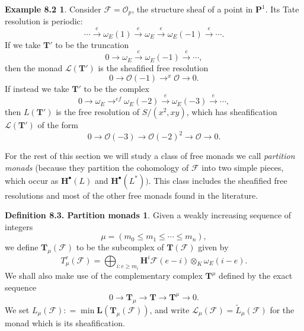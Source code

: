 \documentclass{tran-l}
\newcommand{\tensor}{\otimes}
\newcommand{\F}{\mathcal{F}}
\newcommand{\myH}{\mathbf{H}}
\newcommand{\LL}{\mathbf{L}}
\newcommand{\PP}{\mathbf{P}}
\newcommand{\TT}{\mathbf{T}}
\theoremstyle{plain}
\theoremstyle{remark}
\theoremstyle{definition}
\newtheorem*{definition7}{Example 8.2}
\newtheorem*{definition8}{Definition 8.3. Partition monads}
\begin{document}
\begin{definition7}
Consider $\F = \mathcal{O} _{p}$, the structure sheaf of a
point in $\PP ^{1}$. Its Tate resolution is periodic:
\begin{equation*}\cdots \overset {e}{\longrightarrow }\omega _{E}(1) \overset {e}{\longrightarrow }\omega _{E}
\overset {e}{\longrightarrow }\omega _{E}(-1) \overset {e}{\longrightarrow }\cdots .
\end{equation*}
If we take $\TT '$ to be the truncation
\begin{equation*}0 \longrightarrow \omega _{E} \overset {e}{\longrightarrow }\omega _{E}(-1)\overset {e}{\longrightarrow }
\cdots, \end{equation*}
then the monad $\mathcal{L}(\TT ')$ is the sheafified free resolution
\begin{equation*}0 \longrightarrow \mathcal{O} (-1) \longrightarrow ^{x} \mathcal{O} \longrightarrow 0.
\end{equation*}
If instead we take $\TT '$ to be the complex
\begin{equation*} 0 \longrightarrow \omega _{E} \longrightarrow ^{ef}
\omega _{E}(-2) \overset {e}{\longrightarrow }\omega _{E}(-3)
\overset {e}{\longrightarrow }\cdots ,
\end{equation*}
then $L(\TT ')$ is the free resolution of
$S/(x^{2},xy)$,
which has sheafification $\mathcal{L}(\TT ')$ of the form
\begin{equation*} 0 \longrightarrow \mathcal{O} (-3) \longrightarrow \mathcal{O} (-2)^{2}
\longrightarrow \mathcal{O} \longrightarrow 0.
\end{equation*}

For the rest of this section we will study a class of free monads we
call {\em partition monads\/} (because they partition the cohomology
of $\F $ into two simple pieces, which occur as $\myH ^{\bullet }(L)$ and  $\myH ^{\bullet }(L^{*}))$. This class includes
the sheafified free resolutions and most of the other free monads
found in the literature.
\end{definition7}
\begin{definition8}
Given a weakly increasing sequence of integers
\begin{equation*}\mu =(m_{0} \leq m_{1}\leq \cdots \leq m_{n}),
\end{equation*}
we define
$\TT _{\mu }(\F )$ to be the subcomplex of $\TT (\F )$ given by
\begin{equation*}T_{ \mu }^{e}(\F ) = \bigoplus _{i: e \ge m_{i}} \myH ^{i}\F (e-i) \tensor _{K}
\omega _{E}(i-e).
\end{equation*}
We shall also make use of the complementary complex
$\TT ^{\mu }$
defined by the exact sequence
\begin{equation*}0\to \TT _{\mu }\to \TT \to \TT ^{\mu }\to 0.
\end{equation*}
We set
$L_{\mu }(\F ) : = \min \LL (\TT _{\mu }(\F ))$,
and write
$\mathcal{L}_{ \mu }(\F )=\tilde L_{\mu }(\F )$ for the monad which is its
sheafification.
\end{definition8}
\end{document}
